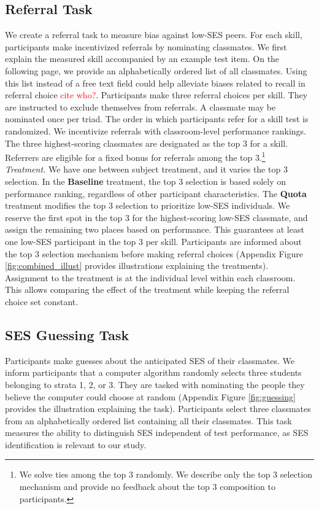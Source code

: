 \documentclass[11pt,a4paper,oneside]{article}
\begin{document}
\subsection{Referral Task} \label{referral_task}
We create a referral task to measure bias against low-SES peers.  For each skill, participants make incentivized referrals by nominating classmates. We first explain the measured skill accompanied by an example test item. On the following page, we provide an alphabetically ordered list of all  classmates. Using this list instead of a free text field could help alleviate biases related to recall in referral choice \textcolor{red}{cite who?}. Participants make three referral choices per skill. They are instructed to exclude themselves from referrals. A classmate may be nominated once per triad. The order in which participants refer for a skill test is randomized. We incentivize referrals with classroom-level performance rankings. The three highest-scoring classmates are designated as the top 3 for a skill. Referrers are eligible for a fixed bonus for referrals among the top 3.\footnote{We solve ties among the top 3 randomly. We describe only the top 3 selection mechanism and provide no feedback about the top 3 composition to participants.}   \medskip\\
\textit{Treatment.} We have one between subject treatment, and it varies the top 3 selection. In the \textbf{Baseline} treatment, the top 3 selection is based solely on performance ranking, regardless of other participant characteristics. The \textbf{Quota} treatment modifies the top 3 selection to prioritize low-SES individuals. We reserve the first spot in the top 3 for the highest-scoring low-SES classmate, and assign the remaining two places based on performance. This guarantees at least one low-SES participant in the top 3 per skill. Participants are informed about the top 3 selection mechanism before making referral choices (Appendix Figure \ref{fig:combined_illust} provides illustrations explaining the treatments). Assignment to the treatment is at the individual level within each classroom. This allows comparing the effect of the treatment while keeping the referral choice set constant.

\subsection{SES Guessing Task}\label{guessing_task}
Participants make guesses about the anticipated SES of their classmates. We inform participants that a computer algorithm randomly selects three students belonging to strata 1, 2, or 3. They are tasked with nominating the people they believe the computer could choose at random (Appendix Figure \ref{fig:guessing} provides the illustration explaining the task). Participants select three classmates from an alphabetically ordered list containing all their classmates. This task measures the ability to distinguish SES independent of test performance, as SES identification is relevant to our study. 
\end{document}
